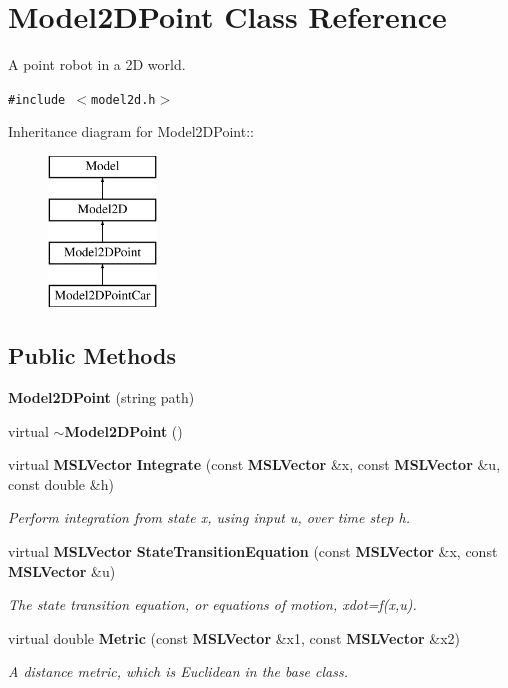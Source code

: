 \section{Model2DPoint  Class Reference}
\label{classModel2DPoint}
A point robot in a 2D world. 


{\tt \#include $<$model2d.h$>$}

Inheritance diagram for Model2DPoint::\begin{figure}[H]
\begin{center}
\leavevmode
\includegraphics[height=4cm]{classModel2DPoint}
\end{center}
\end{figure}
\subsection*{Public Methods}
\begin{CompactItemize}
\item 
{\bf Model2DPoint} (string path)
\item 
virtual {\bf $\sim$Model2DPoint} ()
\item 
virtual {\bf MSLVector} {\bf Integrate} (const {\bf MSLVector} \&x, const {\bf MSLVector} \&u, const double \&h)
\begin{CompactList}\small\item\em Perform integration from state x, using input u, over time step h.\item\end{CompactList}\item 
virtual {\bf MSLVector} {\bf State\-Transition\-Equation} (const {\bf MSLVector} \&x, const {\bf MSLVector} \&u)
\begin{CompactList}\small\item\em The state transition equation, or equations of motion, xdot=f(x,u).\item\end{CompactList}\item 
virtual double {\bf Metric} (const {\bf MSLVector} \&x1, const {\bf MSLVector} \&x2)
\begin{CompactList}\small\item\em A distance metric, which is Euclidean in the base class.\item\end{CompactList}\end{CompactItemize}


